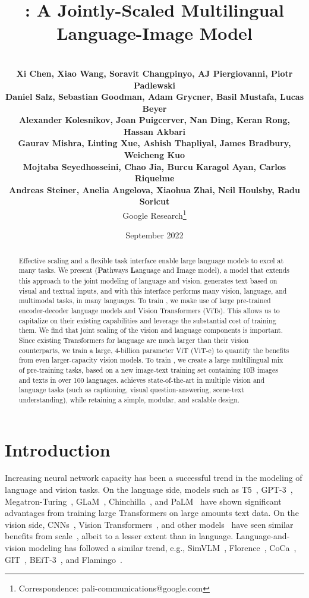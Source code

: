 \documentclass{article}
\title{\NAME: A Jointly-Scaled Multilingual\\Language-Image Model}
\author{
\\
\vspace{0.2em}
\textbf{Xi Chen,\hspace{1mm} Xiao Wang,\hspace{1mm} Soravit Changpinyo,\hspace{1mm} AJ Piergiovanni,\hspace{1mm} Piotr Padlewski }\\ 
\vspace{0.2em}
\textbf{Daniel Salz, \hspace{1mm}Sebastian Goodman, \hspace{1mm}Adam Grycner,\hspace{1mm} Basil Mustafa,\hspace{1mm} Lucas Beyer} \\
\vspace{0.2em}
\textbf{Alexander Kolesnikov,\hspace{1mm} Joan Puigcerver, \hspace{1mm}Nan Ding,\hspace{1mm} Keran Rong, \hspace{1mm}Hassan Akbari} \\
\vspace{0.2em}
\textbf{Gaurav Mishra,\hspace{1mm} Linting Xue,\hspace{1mm} Ashish Thapliyal,\hspace{1mm} James Bradbury,\hspace{1mm} Weicheng Kuo} \\
\vspace{0.2em}
\textbf{Mojtaba Seyedhosseini,\hspace{1mm} Chao Jia,\hspace{1mm} Burcu Karagol Ayan,\hspace{1mm} Carlos Riquelme}\\
\vspace{0.2em}
\textbf{Andreas Steiner,\hspace{1mm} Anelia Angelova,\hspace{1mm} Xiaohua Zhai,\hspace{1mm} Neil Houlsby,\hspace{1mm} Radu Soricut} \\
Google Research\thanks{Correspondence: pali-communications@google.com} \\}
\date{September 2022}
\begin{document}
\maketitle

\begin{abstract}
Effective scaling and a flexible task interface enable large language models to excel at many tasks.
We present \textbf{\NAME} (\textbf{Pa}thways \textbf{L}anguage and \textbf{I}mage model), a model that extends this approach to the joint modeling of language and vision.
\NAME generates text based on visual and textual inputs, and with this interface performs many vision, language, and multimodal tasks, in many languages.
To train \NAME, we make use of large pre-trained encoder-decoder language models and Vision Transformers (ViTs).
This allows us to capitalize on their existing capabilities and leverage the substantial cost of training them.
We find that joint scaling of the vision and language components is important.
Since existing Transformers for language are much larger than their vision counterparts, we train a large, 4-billion parameter ViT (ViT-e) to quantify the benefits from even larger-capacity vision models.
To train \NAME, we create a large multilingual mix of pre-training tasks, based on a new image-text training set containing 10B images and texts in over 100 languages.
\NAME achieves state-of-the-art in multiple vision and language tasks (such as  captioning, visual question-answering, scene-text understanding), while retaining a simple, modular, and scalable design. 
\end{abstract}

\section{Introduction}
Increasing neural network capacity has been a successful trend in the modeling of language and vision tasks.
On the language side, models such as T5~\citep{2020t5}, GPT-3~\citep{brown2020gpt}, Megatron-Turing~\citep{shoeybi2019megatron}, GLaM~\citep{du2022glam}, Chinchilla~\citep{hoffmann2022chinchilla}, and PaLM~\citep{chowdhery2022palm} have shown significant advantages from training large Transformers on large amounts text data.
On the vision side, CNNs~\citep{mahajan2018exploring,huang2018gpipe,bit-2020}, Vision Transformers~\citep{dosovitskiy-2021-vit}, and other models~\citep{tolstikhin-21-mixer,riquelme-21-vmoe} have seen similar benefits from scale~\citep{zhai-21-scalingvit}, albeit to a lesser extent than in language.
Language-and-vision modeling has followed a similar trend, e.g., %
SimVLM~\citep{simvlm}, Florence~\citep{florence}, CoCa~\citep{coca}, GIT~\citep{git}, BEiT-3~\citep{beit3}, and Flamingo~\citep{flamingo}.
\end{document}

